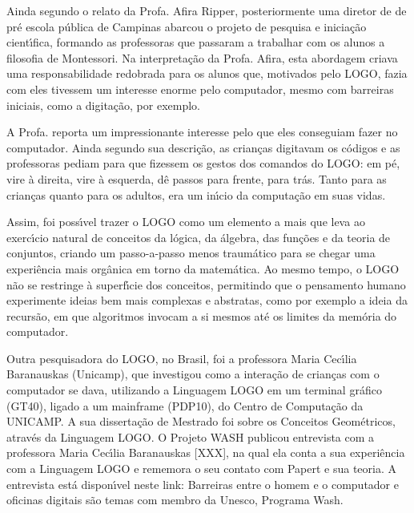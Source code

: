 \documentclass[
12pt,		%
openright,	%
twoside,  %
a4paper,			%
chapter=TITLE,		%
english,			%
french,				%
spanish,			%
brazil				%
]{USPSC-classe/USPSC}
\begin{document}
Ainda segundo o relato da Profa. Afira Ripper, posteriormente uma diretor de de pr\'e escola p\'ublica de Campinas abarcou  o projeto de pesquisa e inicia\c{c}\~ao cient\'{\i}fica, formando as professoras que passaram a trabalhar com os alunos  a filosofia de Montessori. Na interpreta\c{c}\~ao da Profa. Afira, esta abordagem criava uma responsabilidade redobrada para os alunos que, motivados pelo LOGO, fazia com eles tivessem um interesse enorme pelo computador, mesmo com barreiras iniciais, como a digita\c{c}\~ao, por exemplo.


A Profa. reporta um impressionante interesse pelo que eles conseguiam fazer no computador. Ainda segundo sua descri\c{c}\~ao, as crian\c{c}as digitavam  os c\'odigos e as professoras pediam para que fizessem os gestos dos comandos do LOGO: \textquotedbl em p\'e\textquotedbl , \textquotedbl vire \`a direita\textquotedbl , \textquotedbl vire \`a esquerda\textquotedbl , \textquotedbl d\^e passos para frente\textquotedbl , \textquotedbl para tr\'as\textquotedbl . Tanto para as crian\c{c}as quanto para os adultos, era um in\'{\i}cio da computa\c{c}\~ao em suas vidas.


Assim, foi poss\'{\i}vel trazer o LOGO como um elemento a mais que leva ao exerc\'{\i}cio natural de conceitos da l\'ogica, da \'algebra, das fun\c{c}\~oes e da teoria de conjuntos, criando um passo-a-passo menos traum\'atico para se chegar uma experi\^encia mais org\^anica em torno da matem\'atica. Ao mesmo tempo, o LOGO n\~ao se restringe \`a superf\'{\i}cie dos conceitos, permitindo que o pensamento humano experimente ideias bem mais complexas e abstratas, como por exemplo a ideia da recurs\~ao, em que algoritmos invocam a si mesmos at\'e os limites da mem\'oria do computador.


Outra pesquisadora do LOGO, no Brasil, foi a professora Maria Cec\'{\i}lia Baranauskas (Unicamp), que investigou como a intera\c{c}\~ao de crian\c{c}as com o computador se dava, utilizando a Linguagem LOGO em um terminal gr\'afico (GT40), ligado a um mainframe (PDP10), do Centro de Computa\c{c}\~ao da UNICAMP. A sua disserta\c{c}\~ao de Mestrado foi sobre os \textquotedbl Conceitos Geom\'etricos, atrav\'es da Linguagem LOGO\textquotedbl . O Projeto WASH publicou entrevista com a professora Maria Cec\'{\i}lia Baranauskas [XXX], na qual ela conta a sua experi\^encia com a Linguagem LOGO e rememora o seu contato com Papert e sua teoria. A entrevista est\'a dispon\'{\i}vel neste link: \textquotedbl Barreiras entre o homem e o computador e oficinas digitais s\~ao temas com membro da Unesco, Programa Wash\textquotedbl .
\end{document}
